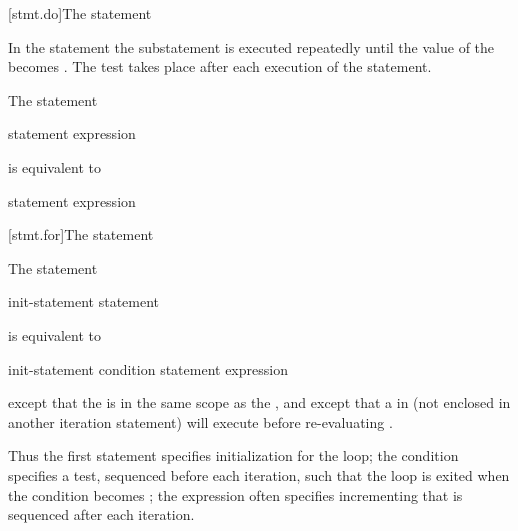 [stmt.do]{The  statement}%

\pnum
In the  statement the substatement is executed repeatedly
until the value of the  becomes .
The test takes place after each execution of the statement.

\pnum
The  statement
\begin{ncsimplebnf}
 statement  \terminal{(} expression \terminal{)} \terminal{;}
\end{ncsimplebnf}
is equivalent to
\begin{ncsimplebnf}
 \terminal{:}\br
\terminal{\{}\br
\bnfindent statement\br
\bnfindent {} \terminal{(} expression \terminal{)} \terminal{\{}\br
\bnfindent \bnfindent {}  \terminal{;}\br
\bnfindent \terminal{\}}\br
\terminal{\}}
\end{ncsimplebnf}

[stmt.for]{The  statement}%

\pnum
The  statement
\begin{ncsimplebnf}
 \terminal{(} init-statement  \terminal{;}  \terminal{)} statement
\end{ncsimplebnf}
is equivalent to
\begin{ncsimplebnf}
\terminal{\{}\br
\bnfindent init-statement\br
\bnfindent {} \terminal{(} condition \terminal{)} \terminal{\{}\br
\bnfindent\bnfindent statement\br
\bnfindent\bnfindent expression \terminal{;}\br
\bnfindent \terminal{\}}\br
\terminal{\}}
\end{ncsimplebnf}
except that the  is
in the same scope as the , and
except that a
%
 in  (not enclosed in another
iteration statement) will execute  before
re-evaluating .
\begin{note}
Thus the first statement specifies initialization for the loop; the
condition specifies a test, sequenced before each
iteration, such that the loop is exited when the condition becomes
; the expression often specifies incrementing that is
sequenced after each iteration.
\end{note}


